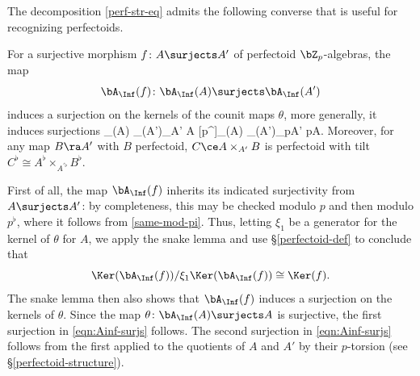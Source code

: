 The decomposition \eqref{perf-str-eq} admits the following converse that is useful for recognizing perfectoids.

\bprop \label{lem:fib-prod}
For a surjective morphism $f\colon A \surjects A'$ of perfectoid $\bZ_p$-algebras, the map
\[
\bA_\Inf(f)\colon \bA_\Inf(A) \surjects \bA_\Inf(A')
\]
induces a surjection on the kernels of the counit maps $\theta$, more generally, it induces surjections
\be \label{eqn:Ainf-surjs}
\bA_\Inf(A) \surjects \bA_\Inf(A')\times_{A'} A  [p^\flat]\bA_\Inf(A) \surjects [p^\flat]\bA_\Inf(A')\times_{pA'} pA.
\ee
Moreover, for any map $B \ra A'$ with $B$ perfectoid, $C \ce A \times_{A'} B$ is perfectoid with tilt $C^\flat \cong A^\flat \times_{A^{\prime\flat}} B^\flat$.
\eprop

\bpf
First of all, the map $\bA_\Inf(f) $ inherits its indicated surjectivity from $A \surjects A'$: by completeness, this may be checked modulo $p$ and then modulo $p^\flat$, where it follows from \eqref{same-mod-pi}. Thus, letting $\xi_1$ be a generator for the kernel of $\theta$ for $A$, we apply the snake lemma and use \S\ref{perfectoid-def} to conclude that
\[
\Ker(\bA_\Inf(f))/\xi_1\Ker(\bA_\Inf(f)) \cong \Ker(f).
\]
The snake lemma then also shows that $\bA_\Inf(f)$ induces a surjection on the kernels of $\theta$.   Since the map $\theta\colon \bA_\Inf(A) \surjects A$ is surjective, the first surjection in \eqref{eqn:Ainf-surjs} follows. The second surjection in \eqref{eqn:Ainf-surjs} follows from the first applied to the quotients of $A$ and $A'$ by their $p$-torsion (see \S\ref{perfectoid-structure}).

